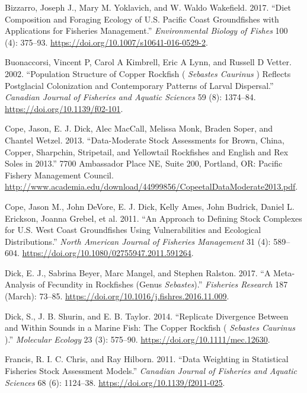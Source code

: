 \documentclass[11pt,
  english,
  a4paper,
]{article}
\begin{document}
\hypertarget{refs}{}
\begin{cslreferences}
\leavevmode\hypertarget{ref-bizzarro_diet_2017-1}{}%
Bizzarro, Joseph J., Mary M. Yoklavich, and W. Waldo Wakefield. 2017. ``Diet Composition and Foraging Ecology of U.S. Pacific Coast Groundfishes with Applications for Fisheries Management.'' \emph{Environmental Biology of Fishes} 100 (4): 375--93. \url{https://doi.org/10.1007/s10641-016-0529-2}.

\leavevmode\hypertarget{ref-buonaccorsi_population_2002}{}%
Buonaccorsi, Vincent P, Carol A Kimbrell, Eric A Lynn, and Russell D Vetter. 2002. ``Population Structure of Copper Rockfish ( \emph{Sebastes Caurinus} ) Reflects Postglacial Colonization and Contemporary Patterns of Larval Dispersal.'' \emph{Canadian Journal of Fisheries and Aquatic Sciences} 59 (8): 1374--84. \url{https://doi.org/10.1139/f02-101}.

\leavevmode\hypertarget{ref-cope_data-moderate_2013}{}%
Cope, Jason, E. J. Dick, Alec MacCall, Melissa Monk, Braden Soper, and Chantel Wetzel. 2013. ``Data-Moderate Stock Assessments for Brown, China, Copper, Sharpchin, Stripetail, and Yellowtail Rockfishes and English and Rex Soles in 2013.'' 7700 Ambassador Place NE, Suite 200, Portland, OR: Pacific Fishery Management Council. \url{http://www.academia.edu/download/44999856/CopeetalDataModerate2013.pdf}.

\leavevmode\hypertarget{ref-cope_approach_2011}{}%
Cope, Jason M., John DeVore, E. J. Dick, Kelly Ames, John Budrick, Daniel L. Erickson, Joanna Grebel, et al. 2011. ``An Approach to Defining Stock Complexes for U.S. West Coast Groundfishes Using Vulnerabilities and Ecological Distributions.'' \emph{North American Journal of Fisheries Management} 31 (4): 589--604. \url{https://doi.org/10.1080/02755947.2011.591264}.

\leavevmode\hypertarget{ref-dick_meta-analysis_2017}{}%
Dick, E. J., Sabrina Beyer, Marc Mangel, and Stephen Ralston. 2017. ``A Meta-Analysis of Fecundity in Rockfishes (Genus \emph{Sebastes}).'' \emph{Fisheries Research} 187 (March): 73--85. \url{https://doi.org/10.1016/j.fishres.2016.11.009}.

\leavevmode\hypertarget{ref-dick_replicate_2014}{}%
Dick, S., J. B. Shurin, and E. B. Taylor. 2014. ``Replicate Divergence Between and Within Sounds in a Marine Fish: The Copper Rockfish ( \emph{Sebastes Caurinus} ).'' \emph{Molecular Ecology} 23 (3): 575--90. \url{https://doi.org/10.1111/mec.12630}.

\leavevmode\hypertarget{ref-francis_data_2011}{}%
Francis, R. I. C. Chris, and Ray Hilborn. 2011. ``Data Weighting in Statistical Fisheries Stock Assessment Models.'' \emph{Canadian Journal of Fisheries and Aquatic Sciences} 68 (6): 1124--38. \url{https://doi.org/10.1139/f2011-025}.


\end{cslreferences}
\end{document}
